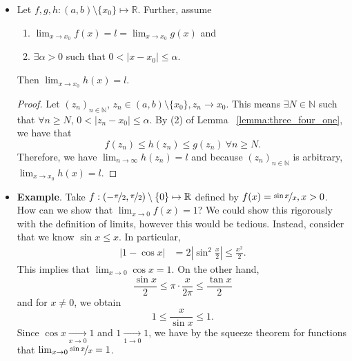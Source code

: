 \documentclass{article}
\newcommand{\Q}{\mathbb{Q}}
\newcommand{\R}{\mathbb{R}}
\newcommand{\N}{\mathbb{N}}
\newcommand{\seq}[2]{(#1_{#2})_{#2 \in \N}}
\newcommand{\?}{\stackrel{?}{=}}
\theoremstyle{definition} %
\begin{document}
\begin{itemize}
\begin{proof}
              \begin{align*}
                  x_1 & \in \Q \cap (0, \delta)               \\
                  x_2 & \in \R \setminus \Q \cap (0, \delta).
              \end{align*}
              We know further that $|f(x_1) - f(x_2)| = 2$ which implies that $f$ does not have a limit at 0 since $x_1$ and $x_2$ do not satisfy the criteria of a Cauchy sequence (Lemma ~\ref{lemma:cauchy_crit}).
          \end{proof}
    \item[]
          \begin{theorem}
              Let $f, g, h: (a, b) \setminus \{x_0\} \mapsto \R$. Further, assume
              \begin{enumerate}[label=(\arabic*)]
                  \item $\lim_{x \to x_0} f(x) = l = \lim_{x \to x_0} g(x)$ and
                  \item $\exists \alpha > 0$ such that $0 < |x - x_0| \leq \alpha$.
              \end{enumerate}
              Then $\lim_{x \to x_0} h(x) = l$.
          \end{theorem}
          \begin{proof}
              Let $\seq{z}{n}$, $z_n \in (a, b) \setminus \{x_0\}, z_n \rightarrow x_0$. This means $\exists N \in \N$ such that $\forall n \geq N$, $0 < |z_n - x_0| \leq \alpha$. By (2) of Lemma ~\ref{lemma:three_four_one}, we have that $$f(z_n) \leq h(z_n) \leq g(z_n) \ \forall n \geq N.$$
              Therefore, we have $\lim_{n \to \infty} h(z_n) = l$ and because $\seq{z}{n}$ is arbitrary, $\lim_{x \to x_0} h(x) = l$.
          \end{proof}
    \item \textbf{Example}. Take $f: (-\nicefrac{\pi}{2}, \nicefrac{\pi}{2}) \setminus \{0\} \mapsto \R$ defined by $f(x) = \nicefrac{\sin x}{x}, x > 0$. How can we show that $\lim_{x \to 0} f(x) = 1$? We could show this rigorously with the definition of limits, however this would be tedious. Instead, consider that we know $\sin x \leq x$. In particular,
          \begin{align*}
              |1 - \cos x| & = 2\left|\sin^2 \frac{x}{2}\right| \leq \frac{x^2}{2}.
          \end{align*}
          This implies that $\lim_{x \to 0} \cos x = 1$. On the other hand,
          $$\frac{\sin x}{2} \leq \pi \cdot \frac{x}{2\pi} \leq \frac{\tan x}{2}$$
          and for $x \neq 0$, we obtain
          $$1 \leq \frac{x}{\sin x} \leq 1.$$
          Since $\cos x \underset{x \to 0}{\longrightarrow} 1$ and $1 \underset{1 \to 0}{\longrightarrow} 1$, we have by the squeeze theorem for functions that $\lim_{x \to 0} \nicefrac{\sin x}{x} = 1$.
\end{itemize}
\end{document}
